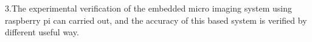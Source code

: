 \begin{enabstract}
	3.The experimental verification of the embedded micro imaging system using raspberry pi can carried out, and the accuracy of this based system is verified by different useful way.\\
\end{enabstract}
